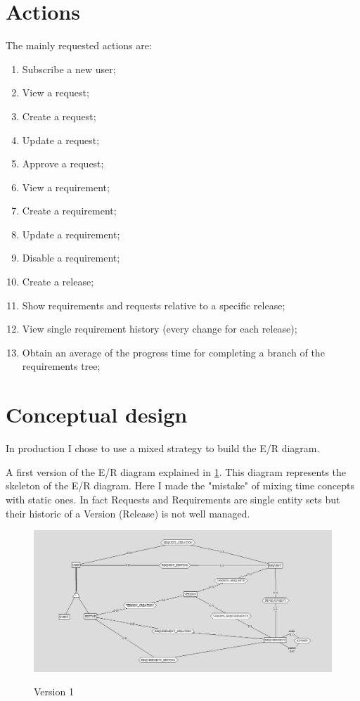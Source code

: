 \documentclass[12pt, a4paper]{report}
\begin{document}
\section*{Actions}

The mainly requested actions are:
\begin{enumerate}
    \item Subscribe a new user;
    \item View a request;
    \item Create a request;
    \item Update a request;
    \item Approve a request;
    \item View a requirement;
    \item Create a requirement;
    \item Update a requirement;
    \item Disable a requirement;
    \item Create a release;
    \item Show requirements and requests relative to a specific release;
    \item View single requirement history (every change for each release);
    \item Obtain an average of the progress time for completing a branch of the requirements tree;
\end{enumerate}

\section*{Conceptual design}

In production I chose to use a mixed strategy to build the E/R diagram.

A first version of the E/R diagram explained in \ref{fig:ER_v1}.
This diagram represents the skeleton of the E/R diagram.
Here I made the "mistake" of mixing time concepts with static ones.
In fact Requests and Requirements are single entity sets but their historic of a Version (Release) is not well managed.

\begin{figure}[H]
\centering
\caption{Version 1}
\includegraphics[width=\textwidth]{E-R conceptual v1}
\label{fig:ER_v1}
\end{figure}
\end{document}
